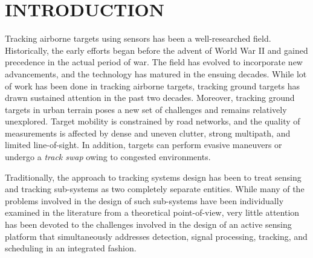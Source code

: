 \documentclass[times]{asjcauth}
\newcommand{\mysmall}{\fontsize{7.5pt}{8pt}\selectfont} %
\begin{document}

\maketitle


\section{INTRODUCTION}
\label{sec:intro}

Tracking airborne targets using sensors has been a well-researched field. Historically, the early efforts began before the advent of World War II and gained precedence in the actual period of war. The field has evolved to incorporate new advancements, and the technology has matured in the ensuing decades. While lot of work has been done in tracking airborne targets, tracking ground targets has drawn sustained attention in the past two decades. Moreover, tracking ground targets in urban terrain poses a new set of challenges and remains relatively unexplored. Target mobility is constrained by road networks, and the quality of measurements is affected by dense and uneven clutter, strong multipath, and limited line-of-sight. In addition, targets can perform evasive maneuvers or undergo a \emph{track swap} owing to congested environments.

Traditionally, the approach to tracking systems design has been to treat sensing and tracking sub-systems as two completely separate entities. While many of the problems involved in the design of such sub-systems have been individually examined in the literature from a theoretical point-of-view, very little attention has been devoted to the challenges involved in the design of an active sensing platform that simultaneously addresses detection, signal processing, tracking, and scheduling in an integrated fashion.
\end{document}
